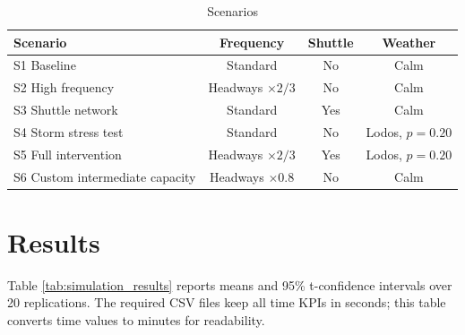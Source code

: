 \documentclass[11pt,a4paper]{article}
\begin{document}
\begin{table}[H]
\centering
\caption{Scenarios}
\label{tab:scenarios}
\begin{tabular}{lccc}
\toprule
\textbf{Scenario} & \textbf{Frequency} & \textbf{Shuttle} & \textbf{Weather} \\
\midrule
S1 Baseline & Standard & No & Calm \\
S2 High frequency & Headways $\times 2/3$ & No & Calm \\
S3 Shuttle network & Standard & Yes & Calm \\
S4 Storm stress test & Standard & No & Lodos, $p=0.20$ \\
S5 Full intervention & Headways $\times 2/3$ & Yes & Lodos, $p=0.20$ \\
S6 Custom intermediate capacity & Headways $\times 0.8$ & No & Calm \\
\bottomrule
\end{tabular}
\end{table}

\section{Results}
Table \ref{tab:simulation_results} reports means and 95\% t-confidence intervals over 20 replications. The required CSV files keep all time KPIs in seconds; this table converts time values to minutes for readability.
\end{document}
